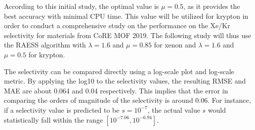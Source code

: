 \documentclass[main]{subfiles}
\begin{document}
According to this initial study, the optimal value is $\mu=0.5$, as it provides the best accuracy with minimal CPU time. This value will be utilized for krypton in order to conduct a comprehensive study on the performance on the Xe/Kr selectivity for materials from CoRE MOF 2019. The following study will thus use the RAESS algorithm with $\lambda=1.6$ and $\mu=0.85$ for xenon and $\lambda=1.6$ and $\mu=0.5$ for krypton.

The selectivity can be compared directly using a log-scale plot and log-scale metric. By applying the log10 to the selectivity values, the resulting RMSE and MAE are about 0.064 and 0.04 respectively. This implies that the error in comparing the orders of magnitude of the selectivity is around 0.06. For instance, if a selectivity value is predicted to be $s = 10^{-7}$, the actual value $s$ would statistically fall within the range $[10^{-7.06},10^{-6.94}]$.
\end{document}
